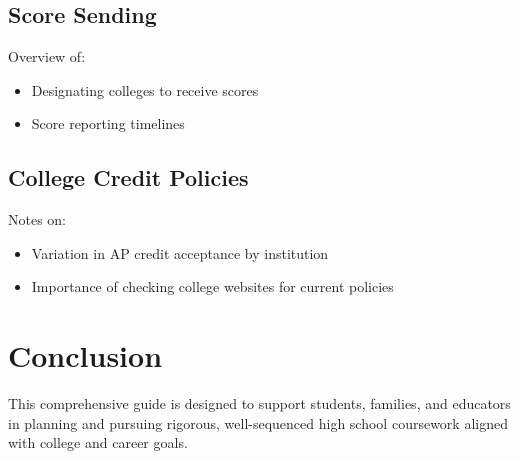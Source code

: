 \documentclass[12pt,oneside]{book}
\begin{document}
\section{Score Sending}
Overview of:
\begin{itemize}[leftmargin=2em]
    \item Designating colleges to receive scores
    \item Score reporting timelines
\end{itemize}

\section{College Credit Policies}
Notes on:
\begin{itemize}[leftmargin=2em]
    \item Variation in AP credit acceptance by institution
    \item Importance of checking college websites for current policies
\end{itemize}

\chapter*{Conclusion}

This comprehensive guide is designed to support students, families, and educators in planning
and pursuing rigorous, well-sequenced high school coursework aligned with college and career goals.
\end{document}
